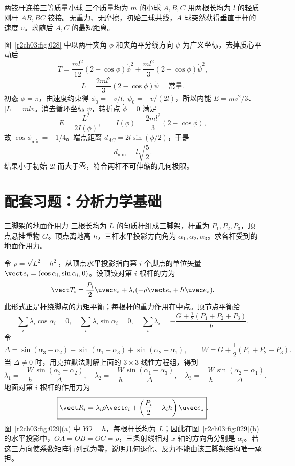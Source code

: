 \begin{practicebox}{两铰杆连接三等质量小球}
三个质量均为 $m$ 的小球 $A,B,C$ 用两根长均为 $l$ 的轻质刚杆 $AB,BC$ 铰接。无重力、无摩擦，初始三球共线，$A$ 球突然获得垂直于杆的速度 $v$。求随后 $A,C$ 的最短距离。
\label{r2ch03:pr:012}
\begin{solution}
图~\ref{r2ch03:fig:028} 中以两杆夹角 $\phi$ 和夹角平分线方向 $\psi$ 为广义坐标，去掉质心平动后
\[
 T=\frac{ml^2}{12}(2+\cos\phi)\dot\phi^2
 +\frac{ml^2}{3}(2-\cos\phi)\dot\psi^2,
\]
\[
 L=\frac{2ml^2}{3}(2-\cos\phi)\dot\psi=\text{常量}.
\]
初态 $\phi=\pi$，由速度约束得
$\dot\phi_0=-v/l,\ \dot\psi_0=-v/(2l)$，所以内能
$E=mv^2/3$、$|L|=mlv$。消去循环坐标 $\psi$，转折点 $\dot\phi=0$ 满足
\[
 E=\frac{L^2}{2I(\phi)},\qquad
 I(\phi)=\frac{2ml^2}{3}(2-\cos\phi),
\]
故 $\cos\phi_{\min}=-1/4$。端点距离
$d_{AC}=2l\sin(\phi/2)$，于是
\[
 \boxed{d_{\min}=l\sqrt{\frac52}}.
\]
结果小于初始 $2l$ 而大于零，符合两杆不可伸缩的几何极限。
\figThreeBallLink
\end{solution}
\end{practicebox}

\section{配套习题：分析力学基础}

\begin{practicebox}{三脚架的地面作用力}
三根长均为 $L$ 的匀质杆组成三脚架，杆重为 $P_1,P_2,P_3$，顶点悬挂重物 $G$。顶点离地高 $h$，三杆水平投影方向角为 $\alpha_1,\alpha_2,\alpha_3$。求各杆受到的地面作用力。
\label{r2ch03:pr:013}
\begin{solution}
令 $\rho=\sqrt{L^2-h^2}$，从顶点水平投影指向第 $i$ 个脚点的单位矢量
$\vect e_i=(\cos\alpha_i,\sin\alpha_i,0)$。设顶铰对第 $i$ 根杆的力为
\[
 \vect T_i=\frac{P_i}{2}\uvec e_z+\lambda_i(-\rho\vect e_i+h\uvec e_z).
\]
此形式正是杆绕脚点的力矩平衡；每根杆的重力作用在中点。顶节点平衡给
\begin{equation*}
 \sum_i\lambda_i\cos\alpha_i=0,\quad
 \sum_i\lambda_i\sin\alpha_i=0,\quad
 \sum_i\lambda_i=-\frac{G+\frac12(P_1+P_2+P_3)}h .
\end{equation*}
令
\[
 \Delta=\sin(\alpha_3-\alpha_2)+\sin(\alpha_1-\alpha_3)
       +\sin(\alpha_2-\alpha_1),\qquad
 W=G+\frac12(P_1+P_2+P_3).
\]
当 $\Delta\ne0$ 时，用克拉默法则解上面的 $3\times3$ 线性方程组，得到
\[
 \lambda_1=-\frac Wh\frac{\sin(\alpha_3-\alpha_2)}{\Delta},\quad
 \lambda_2=-\frac Wh\frac{\sin(\alpha_1-\alpha_3)}{\Delta},\quad
 \lambda_3=-\frac Wh\frac{\sin(\alpha_2-\alpha_1)}{\Delta}.
\]
地面对第 $i$ 根杆的作用力为
\[
 \boxed{\vect R_i=\lambda_i\rho\vect e_i+
 \left(\frac{P_i}{2}-\lambda_i h\right)\uvec e_z}.
\]
图~\ref{r2ch03:fig:029}(a) 中 $YO=h$，每根杆长均为 $L$；因此在图~\ref{r2ch03:fig:029}(b) 的水平投影中，$OA=OB=OC=\rho$，三条射线相对 $x$ 轴的方向角分别是 $\alpha_i$。若这三方向使系数矩阵行列式为零，说明几何退化、反力不能由该三脚架结构唯一承担。
\figTripod
\end{solution}
\end{practicebox}

